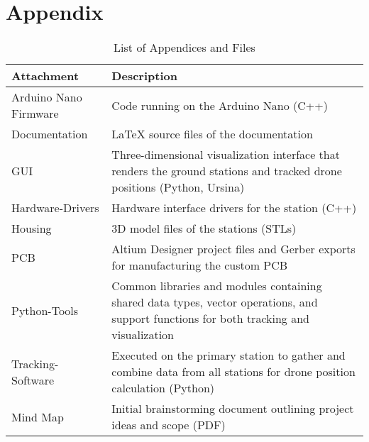 \chapter*{Appendix}

\begin{table}[H]
	\centering
	\renewcommand{\arraystretch}{1.4}
	\setlength{\tabcolsep}{8pt}
	\begin{tabular}{p{} p{}}
		\hline
		\textbf{Attachment} & \textbf{Description} \\
		\hline
		Arduino Nano Firmware
		& Code running on the Arduino Nano (C++)\\
		
		Documentation
		& LaTeX source files of the documentation\\
		
		GUI
		& Three-dimensional visualization interface that renders the ground stations and tracked drone positions (Python, Ursina)\\
		
		Hardware-Drivers
		& Hardware interface drivers for the station (C++)\\
		
		Housing
		& 3D model files of the stations (STLs)\\
		
		PCB
		& Altium Designer project files and Gerber exports for manufacturing the custom PCB\\
		
		Python-Tools
		& Common libraries and modules containing shared data types, vector operations, and support functions for both tracking and visualization\\
				
		Tracking-Software
		& Executed on the primary station to gather and combine data from all stations for drone position calculation (Python)\\
		
		Mind Map
		& Initial brainstorming document outlining project ideas and scope (PDF)\\

		\hline
	\end{tabular}
	\caption{List of Appendices and Files}
	\label{tab:appendixfiles}
\end{table}
